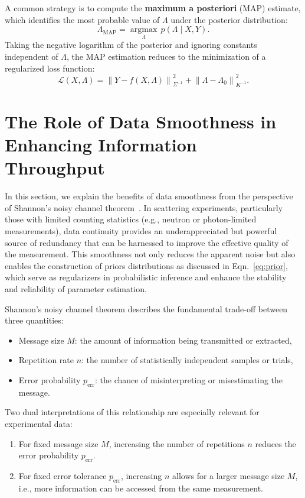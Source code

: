 \documentclass[12pt]{article}
\begin{document}
A common strategy is to compute the \textbf{maximum a posteriori} (MAP) estimate, which identifies the most probable value of \( \Lambda \) under the posterior distribution:
\begin{equation}
    \Lambda_{\text{MAP}} = \operatorname*{argmax}_\Lambda \, p(\Lambda \mid X, Y).
\end{equation}
Taking the negative logarithm of the posterior and ignoring constants independent of \( \Lambda \), the MAP estimation reduces to the minimization of a regularized loss function:
\begin{equation}
    \mathcal{L}(X, \Lambda) = \left\lVert Y - f(X, \Lambda) \right\rVert_{\Sigma^{-1}}^2 + \left\lVert \Lambda-\Lambda_0 \right\rVert_{K^{-1}}^2.
    \label{eq:map_loss}
\end{equation}

\section{The Role of Data Smoothness in Enhancing Information Throughput}
\label{sec:data_smoothness}

In this section, we explain the benefits of data smoothness from the perspective of Shannon's noisy channel theorem~\cite{Shannon}. In scattering experiments, particularly those with limited counting statistics (e.g., neutron or photon-limited measurements), data continuity provides an underappreciated but powerful source of redundancy that can be harnessed to improve the effective quality of the measurement. This smoothness not only reduces the apparent noise but also enables the construction of priors distributions as discussed in Eqn.~\eqref{eq:prior}, which serve as regularizers in probabilistic inference and enhance the stability and reliability of parameter estimation.

Shannon's noisy channel theorem describes the fundamental trade-off between three quantities:
\begin{itemize}
    \item Message size \( M \): the amount of information being transmitted or extracted,
    \item Repetition rate \( n \): the number of statistically independent samples or trials,
    \item Error probability \( p_{\mathrm{err}} \): the chance of misinterpreting or misestimating the message.
\end{itemize}

Two dual interpretations of this relationship are especially relevant for experimental data:
\begin{enumerate}
    \item For fixed message size \( M \), increasing the number of repetitions \( n \) reduces the error probability \( p_{\mathrm{err}} \).
    \item For fixed error tolerance \( p_{\mathrm{err}} \), increasing \( n \) allows for a larger message size \( M \), i.e., more information can be accessed from the same measurement.
\end{enumerate}
\end{document}
